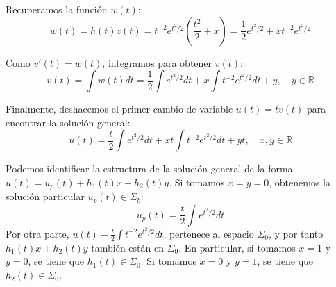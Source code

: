 {    Recuperamos la función $w(t)$:
    \[ w(t) = h(t)z(t) = t^{-2}e^{t^2/2} \left(\frac{t^2}{2} + x\right) = \frac{1}{2}e^{t^2/2} + x t^{-2}e^{t^2/2} \]

    Como $v'(t) = w(t)$, integramos para obtener $v(t)$:
    \[ v(t) = \int w(t) dt = \frac{1}{2}\int e^{t^2/2} dt + x\int t^{-2}e^{t^2/2} dt + y, \quad y \in \mathbb{R} \]

    Finalmente, deshacemos el primer cambio de variable $u(t) = tv(t)$ para encontrar la solución general:
    \[ u(t) = \frac{t}{2}\int e^{t^2/2} dt + x t\int t^{-2}e^{t^2/2} dt + yt, \quad x, y \in \mathbb{R} \]

    Podemos identificar la estructura de la solución general de la forma $u(t) = u_p(t) + h_1(t)x + h_2(t)y$. 
    Si tomamos $x = y = 0$, obtenemos la solución particular $u_p(t) \in \Sigma_b$:
    \[ u_p(t) = \frac{t}{2}\int e^{t^2/2} dt \]
    Por otra parte, $u(t) - \frac{t}{2}\int t^{-2}e^{t^2/2} dt $, pertenece al espacio $\Sigma_0$, y por tanto $h_1(t)x + h_2(t)y$ también están en $\Sigma_0$.
    En particular, si tomamos $x = 1$ y $y = 0$, se tiene que $h_1(t) \in \Sigma_0$.
    Si tomamos $x = 0$ y $y = 1$, se tiene que $h_2(t) \in \Sigma_0$.
}
